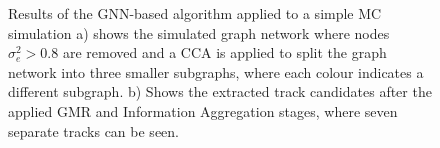 \begin{center}
\begin{figure}[htbp]%
    \centering
    \hfill
    \caption{Results of the GNN-based algorithm applied to a simple MC simulation a) shows the simulated graph network where nodes $\sigma_e^2 > 0.8$ are removed and a CCA is applied to split the graph network into three smaller subgraphs, where each colour indicates a different subgraph. b) Shows the extracted track candidates after the applied GMR and Information Aggregation stages, where seven separate tracks can be seen.}%
    \label{fig:example-application-1}%
\end{figure}
\end{center}


